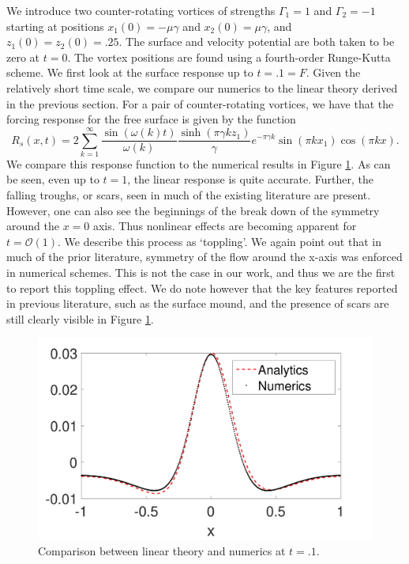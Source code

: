 \documentclass[a4paper,11pt]{article}
\begin{document}
We introduce two counter-rotating vortices of strengths $\Gamma_{1}=1$ and $\Gamma_{2}=-1$ starting at positions $x_{1}(0)=-\mu\gamma$ and $x_{2}(0)=\mu\gamma$, and $z_{1}(0)=z_{2}(0)=.25$.  The surface and velocity potential are both taken to be zero at $t=0$.  The vortex positions are found using a fourth-order Runge-Kutta scheme.  We first look at the surface response up to $t=.1=F$.  Given the relatively short time scale, we compare our numerics to the linear theory derived in the previous section.  For a pair of counter-rotating vortices, we have that the forcing response for the free surface is given by the function
\[
R_{s}(x,t) = 2\sum_{k=1}^{\infty} \frac{\sin(\omega(k)t)}{\omega(k)}\frac{\sinh(\pi \gamma k z_{1})}{\gamma}e^{-\pi \gamma k}\sin(\pi k x_{1})\cos(\pi k x).
\]
We compare this response function to the numerical results in Figure \ref{fig:linrep}.  As can be seen, even up to $t=1$, the linear response is quite accurate.  Further, the falling troughs, or scars, seen in much of the existing literature \cite{marcus,tryggvason} are present.  However, one can also see the beginnings of the break down of the symmetry around the $x=0$ axis. Thus nonlinear effects are becoming apparent for $t = \mathcal{O}(1)$.   We describe this process as `toppling'.  We again point out that in much of the prior literature, symmetry of the flow around the x-axis was enforced in numerical schemes.  This is not the case in our work, and thus we are the first to report this toppling effect.  We do note however that the key features reported in previous literature, such as the surface mound, and the presence of scars are still clearly visible in Figure \ref{fig:linrep}.
\begin{figure}[!h]
\centering
\includegraphics[width=.75\textwidth]{lin_response_tf_pt1}
\caption{Comparison between linear theory and numerics at $t=.1$.}
\label{fig:linrep}
\end{figure}
\end{document}
